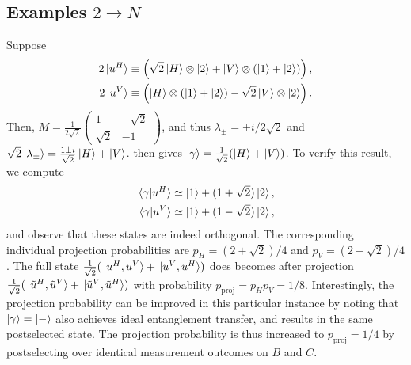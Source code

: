 \documentclass[
	aps, pra,
	superscriptaddress, twocolumn,
	floatfix,
	10pt
]{revtex4-1}
\newcommand{\on}[1]{\operatorname{#1}}
\newcommand{\parTitle}[1]{\noindent{\color{Mahogany}(\emph{#1})}}
\begin{document}
\subsection{Examples \texorpdfstring{$2\to N$}{2->N}}
\parTitle{Example 1}
Suppose
\begin{equation}
\begin{aligned}
    2\ket*{u^H} \equiv \left(
        \sqrt2\ket H \otimes\ket2 +
        \ket V \otimes(\ket1 + \ket2)
    \right), \\
    2\ket*{u^V} \equiv \left(
        \ket H\otimes(\ket1 + \ket2) -
        \sqrt2\ket V\otimes \ket2
    \right).
\end{aligned}
\end{equation}
Then,
$M = \frac{1}{2\sqrt2}\begin{pmatrix}1 & -\sqrt2 \\ \sqrt2 & -1 \end{pmatrix}$,
and thus $\lambda_\pm=\pm i/2\sqrt2$ and
$\sqrt2\ket{\lambda_\pm}=\frac{1\pm i}{\sqrt2}\ket H + \ket V$.
 then gives
$\ket\gamma=\frac{1}{\sqrt2}(\ket H + \ket V)$.
To verify this result, we compute
\begin{equation}
\begin{aligned}
    \braket*{\gamma}{u^H} \simeq %
        \ket1 + (1+\sqrt2)\ket2, \\
    \braket*{\gamma}{u^V} \simeq %
        \ket1 + (1-\sqrt2)\ket2,
\end{aligned}
\end{equation}
and observe that these states are indeed orthogonal.
The corresponding individual projection probabilities are
$p_H=(2+\sqrt2)/4$ and $p_V=(2-\sqrt2)/4$.
The full state $\frac{1}{\sqrt2}(\ket*{u^H,u^V}+\ket*{u^V,u^H})$ does becomes after projection
$\frac{1}{\sqrt2}(\ket*{\tilde u^H,\tilde u^V}+\ket*{\tilde u^V,\tilde u^H})$
with probability $p_{\on{proj}} = p_H p_V = 1/8$.
Interestingly, the projection probability can be improved in this particular instance by noting that $\ket\gamma=\ket -$ also achieves ideal entanglement transfer, and results in the same postselected state. The projection probability is thus increased to $p_{\on{proj}}=1/4$ by postselecting over identical measurement outcomes on $B$ and $C$.
\end{document}
